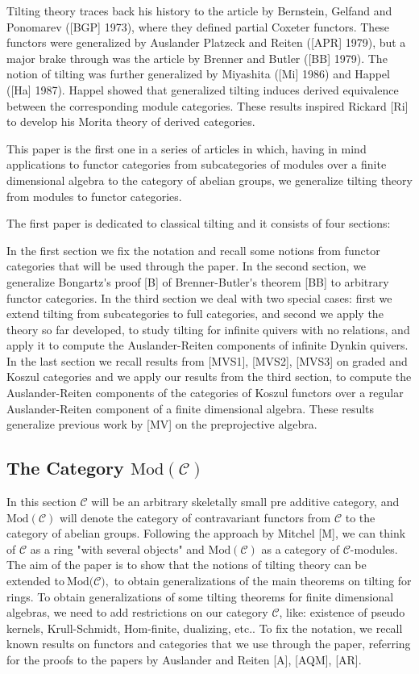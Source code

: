 \documentclass{amsart}
\theoremstyle{plain}
\numberwithin{equation}{section}
\begin{document}
Tilting theory traces back his history to the article by Bernstein, Gelfand
and Ponomarev ([BGP] 1973), where they defined partial Coxeter functors.
These functors were generalized by Auslander Platzeck and Reiten ([APR]
1979), but a major brake through was the article by Brenner and Butler ([BB]  1979). The notion of tilting was further generalized by Miyashita ([Mi] 1986) and Happel ([Ha] 1987). Happel showed that generalized tilting
induces derived equivalence between the corresponding module categories.
These results inspired Rickard [Ri] to develop his Morita theory of
derived categories.

This paper is the first one in a series of articles in which, having in mind
applications to functor categories from subcategories of modules over a
finite dimensional algebra to the category of abelian groups, we generalize
tilting theory from modules to functor categories.

The first paper is dedicated to classical tilting and it consists of four
sections:

In the first section we fix the notation and recall some notions from
functor categories that will be used through the paper. In the second
section, we generalize Bongartz\'{}s proof [B] of Brenner-Butler\'{}s theorem [BB] to arbitrary functor categories. In the third section we
deal with two special cases: first we extend tilting from subcategories to
full categories, and second we apply the theory so far developed, to study
tilting for infinite quivers with no relations, and apply it to compute the
Auslander-Reiten components of infinite Dynkin quivers. In the last section
we recall results from [MVS1], [MVS2], [MVS3] on graded and Koszul
categories and we apply our results from the third section, to compute the
Auslander-Reiten components of the categories of Koszul functors over a
regular Auslander-Reiten component of a finite dimensional algebra. These
results generalize previous work by [MV] on the preprojective algebra.

\subsection{The Category $\mathrm{Mod}(\mathcal{C})$}

In this section $\mathcal{C}$ will be an arbitrary skeletally small pre
additive category, and $\mathrm{Mod}(\mathcal{C})$ will denote the category
of contravariant functors from $\mathcal{C}$ to the category of abelian
groups. Following the approach by Mitchel [M], we can think of $\mathcal{C}$
as a ring "with several objects" and $\mathrm{Mod}(\mathcal{C})$ as a
category of $\mathcal{C}$-modules. The aim of the paper is to show that the
notions of tilting theory can be extended to$\mathcal{\ }\mathrm{Mod}(\mathcal{C)},$ to obtain generalizations of the main theorems on tilting for
rings. To obtain generalizations of some tilting theorems for finite
dimensional algebras, we need to add restrictions on our category $\mathcal{C}$, like: existence of pseudo kernels, Krull-Schmidt, $\mathrm{Hom}$-finite,
dualizing, etc.. To fix the notation, we recall known results on functors
and categories that we use through the paper, referring for the proofs to
the papers by Auslander and Reiten [A], [AQM], [AR].
\end{document}
